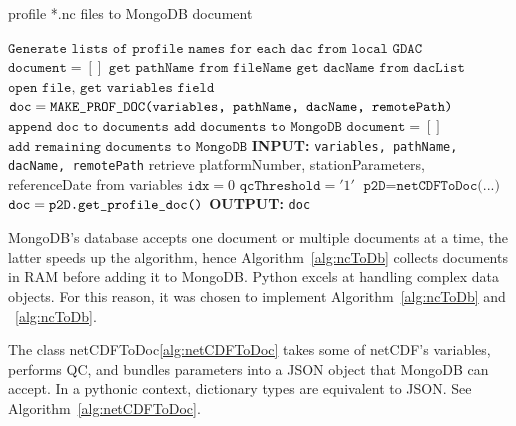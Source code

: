 \begin{algorithm}
\caption{profile *.nc files to MongoDB document}\label{alg:ncToDb}
\begin{algorithmic}[1]
\State $\texttt{Generate lists of profile names for each dac from local GDAC}$
\State $\texttt{document} = []$
\State $\texttt{get pathName from fileName}$
\State $\texttt{get dacName from dacList}$
\State $\texttt{open file, get variables field}$
\State $\texttt{doc} = \texttt{MAKE\textunderscore PROF\textunderscore DOC(variables, pathName, dacName, remotePath)}$
\State $\texttt{append doc to documents}$
\State $\texttt{add documents to MongoDB}$
\State $\texttt{document} = []$
\EndIf
\EndLoop
\State $\texttt{add remaining documents to MongoDB}$
\EndLoop
\EndProcedure
{}
\State \textbf{INPUT:} \texttt{variables, pathName, dacName, remotePath}
\State retrieve platformNumber, stationParameters, referenceDate from variables
\State $\texttt{idx}=0$
\State $\texttt{qcThreshold}='1'$
\State $\texttt{p2D} = \texttt{netCDFToDoc(...)}$
\State $\texttt{doc} = \texttt{p2D.get\textunderscore profile\textunderscore doc()}$
\State \textbf{OUTPUT:} \texttt{doc}
\EndProcedure
\end{algorithmic}
\end{algorithm}

MongoDB's database accepts one document or multiple documents at a time, the latter speeds up the algorithm, hence Algorithm~\ref{alg:ncToDb} collects documents in RAM before adding it to MongoDB. Python excels at handling complex data objects. For this reason, it was chosen to implement Algorithm~\ref{alg:ncToDb} and ~\ref{alg:ncToDb}.

The class netCDFToDoc\ref{alg:netCDFToDoc} takes some of netCDF's variables, performs QC, and bundles parameters into a JSON object that MongoDB can accept. In a pythonic context, dictionary types are equivalent to JSON. See Algorithm~\ref{alg:netCDFToDoc}.


